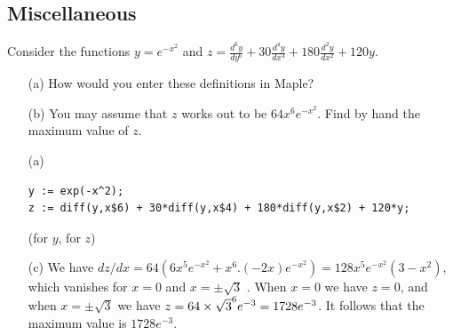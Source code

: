 \documentclass[a4paper]{article}
\begin{document}
\subsection{Miscellaneous}

\begin{problem}
 Consider the functions $y=e^{-x^2}$ and 
 $\displaystyle z=\frac{d^6y}{dy^6}+30\frac{d^4y}{dx^4}+180\frac{d^2y}{dx^2}+120y$.
 \begin{itemize}
  \item[(a)] How would you enter these definitions in
   Maple? 
  \item[(b)] You may assume that $z$ works out to be $64x^6e^{-x^2}$.
   Find by hand the maximum value of $z$. 
 \end{itemize}
\end{problem}
\begin{solution}
 \begin{itemize}
  \item[(a)] 
\begin{verbatim}
y := exp(-x^2);
z := diff(y,x$6) + 30*diff(y,x$4) + 180*diff(y,x$2) + 120*y;
\end{verbatim}
   (\mk for $y$,  for $z$)
  \item[(c)] We have
   $dz/dx=64(6x^5e^{-x^2}+x^6.(-2x)e^{-x^2})=128x^5e^{-x^2}(3-x^2)$, 
   which vanishes for $x=0$ and $x=\pm\sqrt{3}$ \mk.  When $x=0$ we have
   $z=0$, and when $x=\pm\sqrt{3}$ we have
   $z=64\times\sqrt{3}^6e^{-3}=1728e^{-3}$.  It follows that the maximum
   value is $1728e^{-3}$. \mk
 \end{itemize}
\end{solution}
\end{document}
